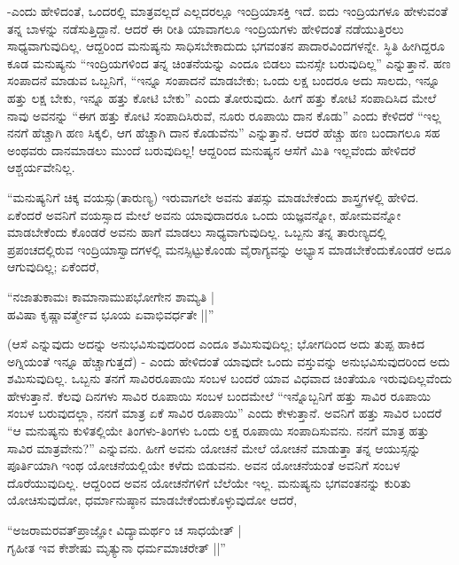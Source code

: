 -ಎಂದು ಹೇಳಿದಂತೆ, ಒಂದರಲ್ಲಿ ಮಾತ್ರವಲ್ಲದೆ ಎಲ್ಲದರಲ್ಲೂ ಇಂದ್ರಿಯಾಸಕ್ತಿ ಇದೆ. ಐದು ಇಂದ್ರಿಯಗಳೂ ಹೇಳುವಂತೆ ತನ್ನ ಬಾಳನ್ನು ನಡೆಸುತ್ತಿದ್ದಾನೆ. ಆದರೆ ಈ ರೀತಿ ಯಾವಾಗಲೂ ಇಂದ್ರಿಯಗಳು ಹೇಳಿದಂತೆ ನಡೆಯುತ್ತಿರಲು ಸಾಧ್ಯವಾಗುವುದಿಲ್ಲ. ಆದ್ದರಿಂದ ಮನುಷ್ಯನು ಸಾಧಿಸಬೇಕಾದುದು ಭಗವಂತನ ಪಾದಾರವಿಂದಗಳನ್ನೇ. ಸ್ಥಿತಿ ಹೀಗಿದ್ದರೂ ಕೂಡ ಮನುಷ್ಯನು ``ಇಂದ್ರಿಯಗಳಿಂದ ತನ್ನ ಚಿಂತನೆಯನ್ನು ಎಂದೂ ಬಿಡಲು ಮನಸ್ಸೇ ಬರುವುದಿಲ್ಲ'' ಎನ್ನುತ್ತಾನೆ. ಹಣ ಸಂಪಾದನೆ ಮಾಡುವ ಒಬ್ಬನಿಗೆ, ``ಇನ್ನೂ ಸಂಪಾದನೆ ಮಾಡಬೇಕು; ಒಂದು ಲಕ್ಷ ಬಂದರೂ ಅದು ಸಾಲದು, ಇನ್ನೂ ಹತ್ತು ಲಕ್ಷ ಬೇಕು, ಇನ್ನೂ ಹತ್ತು  ಕೋಟಿ ಬೇಕು'' ಎಂದು ತೋರುವುದು. ಹೀಗೆ ಹತ್ತು ಕೋಟಿ ಸಂಪಾದಿಸಿದ ಮೇಲೆ ನಾವು ಅವನನ್ನು ``ಈಗ ಹತ್ತು ಕೋಟಿ ಸಂಪಾದಿಸಿರುವೆ, ನೂರು ರೂಪಾಯಿ ದಾನ ಕೊಡು'' ಎಂದು ಕೇಳಿದರೆ ``ಇಲ್ಲ ನನಗೆ ಹೆಚ್ಚಾಗಿ ಹಣ ಸಿಕ್ಕಲಿ, ಆಗ ಹೆಚ್ಚಾಗಿ ದಾನ ಕೊಡುವೆನು'' ಎನ್ನುತ್ತಾನೆ. ಆದರೆ ಹೆಚ್ಚು ಹಣ ಬಂದಾಗಲೂ ಸಹ ಅಂಥವರು ದಾನಮಾಡಲು ಮುಂದೆ ಬರುವುದಿಲ್ಲ! ಆದ್ದರಿಂದ ಮನುಷ್ಯನ ಆಸೆಗೆ ಮಿತಿ ಇಲ್ಲವೆಂದು ಹೇಳಿದರೆ ಆಶ್ಚರ್ಯವೇನಿಲ್ಲ.

``ಮನುಷ್ಯನಿಗೆ ಚಿಕ್ಕ ವಯಸ್ಸು(ತಾರುಣ್ಯ) ಇರುವಾಗಲೇ ಅವನು ತಪಸ್ಸು ಮಾಡಬೇಕೆಂದು ಶಾಸ್ತ್ರಗಳಲ್ಲಿ ಹೇಳಿದ. ಏಕೆಂದರೆ ಅವನಿಗೆ ವಯಸ್ಸಾದ ಮೇಲೆ ಅವನು ಯಾವುದಾದರೂ ಒಂದು ಯಜ್ಞವನ್ನೋ, ಹೋಮವನ್ನೋ ಮಾಡಬೇಕೆಂದು ಕೊಂಡರೆ ಅವನು ಹಾಗೆ ಮಾಡಲು ಸಾಧ್ಯವಾಗುವುದಿಲ್ಲ. ಒಬ್ಬನು ತನ್ನ ತಾರುಣ್ಯದಲ್ಲಿ ಪ್ರಪಂಚದಲ್ಲಿರುವ ಇಂದ್ರಿಯಾಸ್ವಾದಗಳಲ್ಲಿ ಮನಸ್ಸಿಟ್ಟುಕೊಂಡು ವೈರಾಗ್ಯವನ್ನು ಅಭ್ಯಾಸ ಮಾಡಬೇಕೆಂದುಕೊಂಡರೆ ಅದೂ ಆಗುವುದಿಲ್ಲ; ಏಕೆಂದರೆ,

\begin{shloka}
``ನಜಾತುಕಾಮಃ ಕಾಮಾನಾಮುಪಭೋಗೇನ ಶಾಮ್ಯತಿ |\\
ಹವಿಷಾ ಕೃಷ್ಣಾವರ್ತ್ಮೇವ ಭೂಯ ಏವಾಭಿವರ್ಧತೇ ||''
\end{shloka}

(ಆಸೆ ಎನ್ನುವುದು ಅದನ್ನು ಅನುಭವಿಸುವುದರಿಂದ ಎಂದೂ ಶಮಿಸುವುದಿಲ್ಲ; ಭೋಗದಿಂದ ಅದು ತುಪ್ಪ ಹಾಕಿದ ಅಗ್ನಿಯಂತೆ ಇನ್ನೂ ಹೆಚ್ಚಾಗುತ್ತದೆ) - ಎಂದು ಹೇಳಿದಂತೆ ಯಾವುದೇ ಒಂದು ವಸ್ತುವನ್ನು ಅನುಭವಿಸುವುದರಿಂದ ಅದು ಶಮಿಸುವುದಿಲ್ಲ. ಒಬ್ಬನು ತನಗೆ ಸಾವಿರರೂಪಾಯಿ ಸಂಬಳ ಬಂದರೆ ಯಾವ ವಿಧವಾದ ಚಿಂತೆಯೂ ಇರುವುದಿಲ್ಲವೆಂದು ಹೇಳುತ್ತಾನೆ. ಕೆಲವು ದಿನಗಳು ಸಾವಿರ ರೂಪಾಯಿ ಸಂಬಳ ಬಂದಮೇಲೆ ``ಇನ್ನೊಬ್ಬನಿಗೆ ಹತ್ತು ಸಾವಿರ ರೂಪಾಯಿ ಸಂಬಳ ಬರುವುದಲ್ಲಾ, ನನಗೆ ಮಾತ್ರ ಏಕೆ ಸಾವಿರ ರೂಪಾಯಿ'' ಎಂದು ಕೇಳುತ್ತಾನೆ. ಅವನಿಗೆ ಹತ್ತು ಸಾವಿರ ಬಂದರೆ ``ಆ ಮನುಷ್ಯನು ಕುಳಿತಲ್ಲಿಯೇ ತಿಂಗಳು-ತಿಂಗಳು ಒಂದು ಲಕ್ಷ ರೂಪಾಯಿ ಸಂಪಾದಿಸುವನು. ನನಗೆ ಮಾತ್ರ ಹತ್ತು ಸಾವಿರ ಮಾತ್ರವೇನು?'' ಎನ್ನುವನು. ಹೀಗೆ ಅವನು ಯೋಚನೆ ಮೇಲೆ ಯೋಚನೆ ಮಾಡುತ್ತಾ ತನ್ನ ಆಯುಸ್ಸನ್ನು ಪೂರ್ತಿಯಾಗಿ ಇಂಥ ಯೋಚನೆಯಲ್ಲಿಯೇ ಕಳೆದು ಬಿಡುವನು. ಅವನ ಯೋಚನೆಯಂತೆ ಅವನಿಗೆ ಸಂಬಳ ದೊರೆಯುವುದಿಲ್ಲ. ಆದ್ದರಿಂದ ಅವನ ಯೋಚನೆಗಳಿಗೆ ಬೆಲೆಯೇ ಇಲ್ಲ. ಮನುಷ್ಯನು ಭಗವಂತನನ್ನು ಕುರಿತು ಯೋಚಿಸುವುದೋ, ಧರ್ಮಾನುಷ್ಠಾನ ಮಾಡಬೇಕೆಂದುಕೊಳ್ಳುವುದೋ ಆದರೆ,

\begin{shloka}
``ಅಜರಾಮರವತ್‌ಪ್ರಾಜ್ಞೋ ವಿದ್ಯಾಮರ್ಥಂ ಚ ಸಾಧಯೇತ್ |\\
ಗೃಹೀತ ಇವ ಕೇಶೇಷು ಮೃತ್ಯುನಾ ಧರ್ಮಮಾಚರೇತ್ ||''
\end{shloka}

